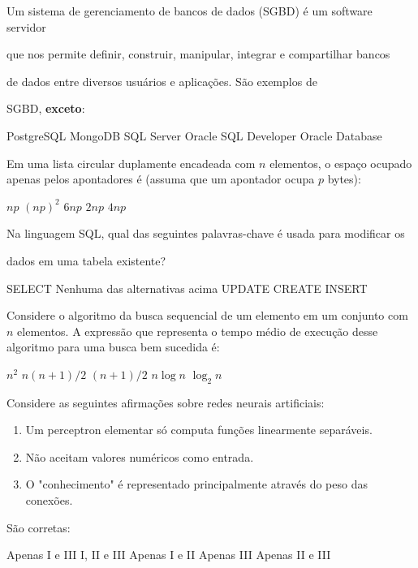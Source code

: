 \documentclass[12pt, addpoints]{exam}
\begin{document}
\begin{questions}
\question

Um sistema de gerenciamento de bancos de dados (SGBD) é um software servidor

que nos permite definir, construir, manipular, integrar e compartilhar bancos

de dados entre diversos usuários e aplicações. São exemplos de

SGBD, \textbf{exceto}:
\begin{choices}
\choice PostgreSQL
\choice MongoDB
\choice SQL Server
\choice Oracle SQL Developer
\choice Oracle Database
\end{choices}

\question

Em uma lista circular duplamente encadeada com \( n \) elementos, o espaço ocupado apenas pelos apontadores é (assuma que um apontador ocupa \( p \) bytes):
\begin{choices}
\choice \( np \)
\choice \( (np)^2 \)
\choice \( 6np \)
\choice \( 2np \)
\choice \( 4np \)
\end{choices}

\question

Na linguagem SQL, qual das seguintes palavras-chave é usada para modificar os

dados em uma tabela existente?


\begin{choices}
\choice SELECT
\choice Nenhuma das alternativas acima
\choice UPDATE
\choice CREATE
\choice INSERT
\end{choices}

\question

Considere o algoritmo da busca sequencial de um elemento em um conjunto com \( n \) elementos. A expressão que representa o tempo médio de execução desse algoritmo para uma busca bem sucedida é:
\begin{choices}
\choice \( n^2 \)
\choice \( n(n + 1)/2 \)
\choice \( (n + 1)/2 \)
\choice \( n \log n \)
\choice \( \log_2 n \)
\end{choices}

\question

Considere as seguintes afirmações sobre redes neurais artificiais: \begin{enumerate}[label=\Roman*.] \item Um perceptron elementar só computa funções linearmente separáveis. \item Não aceitam valores numéricos como entrada. \item O "conhecimento" é representado principalmente através do peso das conexões. \end{enumerate} São corretas:
\begin{choices}
\choice Apenas I e III
\choice I, II e III
\choice Apenas I e II 
\choice Apenas III
\choice Apenas II e III
\end{choices}


\end{questions}
\end{document}
